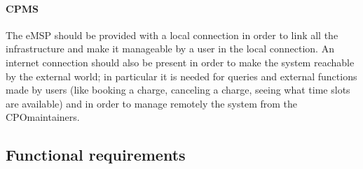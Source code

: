 \paragraph{\ac{CPMS}}
The \ac{eMSP} should be provided with a local connection in order to link all the infrastructure and make it manageable by a user in the local connection.
An internet connection should also be present in order to make the system reachable by the external world; in particular it is needed for queries and external functions made by users (like booking a charge, canceling a charge, seeing what time slots are available) and in order to manage remotely the system from the \ac{CPO}maintainers.

\subsection{Functional requirements}

